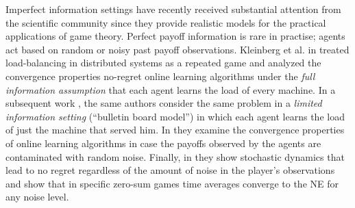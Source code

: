 Imperfect information settings have recently received substantial attention
from the scientific community since they provide realistic models for
the practical applications of game theory.  Perfect payoff information
is rare in practise; agents act based on random or noisy past payoff observations.
Kleinberg et al. in \cite{KPT09} treated load-balancing in distributed systems
as a repeated game and analyzed the convergence properties
no-regret online learning algorithms under the \emph{full information assumption}
that each agent learns the load of every machine.
In a subsequent work \cite{KPT11}, the same authors consider the
same problem in a \emph{limited information setting}
(\enquote{bulletin board model})
in which each agent learns the load of just the machine
that served him. In \cite{HCM17,MS17} they examine the convergence
properties of online learning algorithms in case the payoffs observed
by the agents are contaminated with random noise.
Finally, in \cite{BM17} they show stochastic dynamics that
lead to no regret regardless of the amount of noise in the
player's observations and show that in specific zero-sum games
time averages converge to the NE for any noise level.
